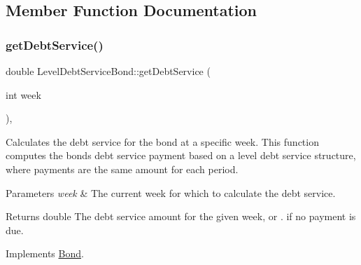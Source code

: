 \subsection{Member Function Documentation}
\mbox{\label{classLevelDebtServiceBond_adcb3bd3c34b0cbb7b013f387ddd8b7f5}} 
\subsubsection{\texorpdfstring{get\+Debt\+Service()}{getDebtService()}}
{\footnotesize\ttfamily double Level\+Debt\+Service\+Bond\+::get\+Debt\+Service (\begin{DoxyParamCaption}\item[{int}]{week }\end{DoxyParamCaption})\hspace{0.3cm}{\ttfamily [override]}, {\ttfamily [virtual]}}



Calculates the debt service for the bond at a specific week. This function computes the bond\textquotesingle{}s debt service payment based on a level debt service structure, where payments are the same amount for each period. 


\begin{DoxyParams}{Parameters}
{\em week} & The current week for which to calculate the debt service.\\
\hline
\end{DoxyParams}
\begin{DoxyReturn}{Returns}
double The debt service amount for the given week, or {.} if no payment is due. 
\end{DoxyReturn}


Implements \mbox{\hyperlink{classBond_a98d8ecaf4b36319674ebd220598996bc}{Bond}}.

\mbox{\label{classLevelDebtServiceBond_a0f5820c3e76b8b908dbe153a8291d96a}} 
